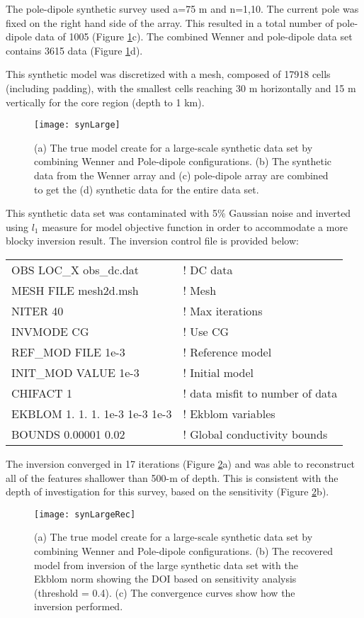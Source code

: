 The pole-dipole synthetic survey used a=75 m and n=1,10. The current pole was fixed on the right hand side of the array. This resulted in a total number of pole-dipole data of 1005 (Figure \ref{fig:synLarge}c). The combined Wenner and pole-dipole data set contains 3615 data (Figure \ref{fig:synLarge}d).

This synthetic model was discretized with a mesh, composed of 17918 cells (including padding), with the smallest cells reaching 30 m horizontally and 15 m vertically for the core region (depth to 1 km).
%
\begin{figure}
\centering
\texttt{[image: synLarge]}
\caption{(a) The true model create for a large-scale synthetic data set by combining Wenner and Pole-dipole configurations. (b) The synthetic data from the Wenner array and (c) pole-dipole array are combined to get the (d) synthetic data for the entire data set.}
\label{fig:synLarge}
\end{figure}

This synthetic data set was contaminated with 5\% Gaussian noise and inverted using $l_1$ measure for model objective function in order to accommodate a more blocky inversion result. The inversion control file is provided below:
%
\begin{fileExample}
\begin{tabular}{|ll|}
\hline
OBS LOC\_X obs\_dc.dat & ! DC data \\
MESH FILE mesh2d.msh & ! Mesh \\
NITER 40 & ! Max iterations\\
INVMODE CG & ! Use CG \\
REF\_MOD FILE 1e-3 & ! Reference model \\
INIT\_MOD VALUE 1e-3 & ! Initial model \\
CHIFACT 1 & ! data misfit to number of data \\
EKBLOM 1. 1. 1. 1e-3 1e-3 1e-3 & ! Ekblom variables \\
BOUNDS 0.00001 0.02 & ! Global conductivity bounds \\
\hline
\end{tabular}
\end{fileExample}

The inversion converged in 17 iterations (Figure \ref{fig:synLargeRes}a) and was able to reconstruct all of the features shallower than 500-m of 	depth. This is consistent with the depth of investigation for this survey, based on the sensitivity (Figure \ref{fig:synLargeRes}b).
%
\begin{figure}
\centering
\texttt{[image: synLargeRec]}
\caption{(a) The true model create for a large-scale synthetic data set by combining Wenner and Pole-dipole configurations. (b) The recovered model from inversion of the large synthetic data set with the Ekblom norm showing the DOI based on sensitivity analysis (threshold = 0.4). (c) The convergence curves show how the inversion performed.}
\label{fig:synLargeRes}
\end{figure}

